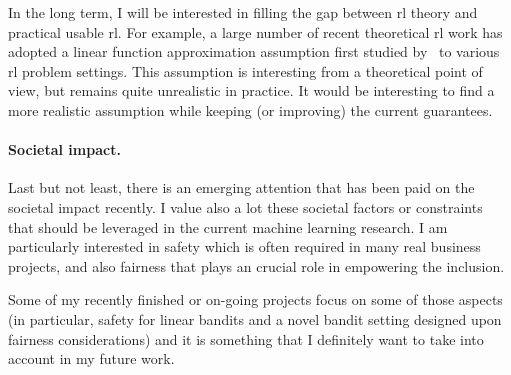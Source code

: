 In the long term, I will be interested in filling the gap between \gls{rl} theory and practical usable \gls{rl}. For example, a large number of recent theoretical \gls{rl} work has adopted a linear function approximation assumption first studied by~\cite{jin2019linear} to various \gls{rl} problem settings. This assumption is interesting from a theoretical point of view, but remains quite unrealistic in practice. It would be interesting to find a more realistic assumption while keeping (or improving) the current guarantees.

\paragraph{Societal impact.}
Last but not least, there is an emerging attention that has been paid on the societal impact recently. I value also a lot these societal factors or constraints that should be leveraged in the current machine learning research. I am particularly interested in safety which is often required in many real business projects, and also fairness that plays an crucial role in empowering the inclusion.

Some of my recently finished or on-going projects focus on some of those aspects (in particular, safety for linear bandits and a novel bandit setting designed upon fairness considerations) and it is something that I definitely want to take into account in my future work.
